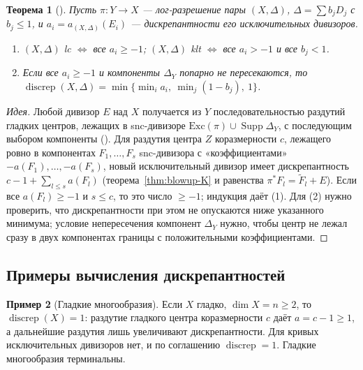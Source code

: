 \documentclass[11pt,a4paper]{article}
\theoremstyle{plain}
\newtheorem{theorem}{Теорема}[section]
\theoremstyle{definition}
\newtheorem{example}[theorem]{Пример}
\theoremstyle{remark}
\DeclareMathOperator{\discrep}{discrep}
\DeclareMathOperator{\Supp}{Supp}
\begin{document}
\begin{theorem}[{\cite[2.31, 2.32]{KM}}]\label{thm:discrep-one-resolution}
Пусть $\pi\colon Y\to X$ --- лог-разрешение пары $(X,\Delta)$, $\Delta=\sum b_jD_j$ с $b_j\le1$, и
$a_i=a_{(X,\Delta)}(E_i)$ --- дискрепантности его исключительных дивизоров.
\begin{enumerate}
\item $(X,\Delta)$ lc $\iff$ все $a_i\ge-1$; $(X,\Delta)$ klt $\iff$ все $a_i>-1$ и все $b_j<1$.
\item Если все $a_i\ge-1$ и компоненты $\Delta_Y$ попарно не пересекаются, то
$\discrep(X,\Delta)=\min\{\min_ia_i,\ \min_j(1-b_j),\ 1\}$.
\end{enumerate}
\end{theorem}
\begin{proof}[Идея]
Любой дивизор $E$ над $X$ получается из $Y$ последовательностью раздутий гладких центров,
лежащих в snc-дивизоре $\mathrm{Exc}(\pi)\cup\Supp\Delta_Y$, с последующим выбором компоненты
(\cite[2.45]{KM}). Для раздутия центра $Z$ коразмерности $c$, лежащего ровно в компонентах
$F_1,\dots,F_s$ snc-дивизора с «коэффициентами» $-a(F_1),\dots,-a(F_s)$, новый исключительный
дивизор имеет дискрепантность $c-1+\sum_{l\le s}a(F_l)$ (теорема~\ref{thm:blowup-K} и равенства
$\pi^*F_l=\tilde F_l+E$). Если все $a(F_l)\ge-1$ и $s\le c$, то это число $\ge-1$; индукция даёт (1).
Для (2) нужно проверить, что дискрепантности при этом не опускаются ниже указанного минимума;
условие непересечения компонент $\Delta_Y$ нужно, чтобы центр не лежал сразу в двух компонентах
границы с положительными коэффициентами.
\end{proof}

\subsection{Примеры вычисления дискрепантностей}

\begin{example}[Гладкие многообразия]
Если $X$ гладко, $\dim X=n\ge2$, то $\discrep(X)=1$: раздутие гладкого центра коразмерности $c$
даёт $a=c-1\ge1$, а дальнейшие раздутия лишь увеличивают дискрепантности. Для кривых исключительных
дивизоров нет, и по соглашению $\discrep=1$. Гладкие многообразия терминальны.
\end{example}
\end{document}
